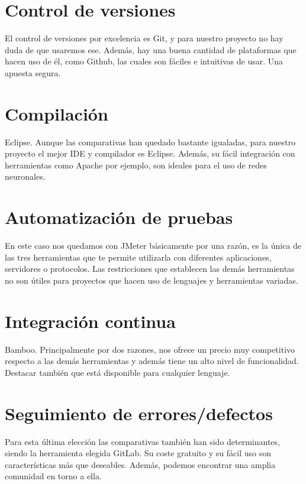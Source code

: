 	
	\newpage	
 
\section{Control de versiones}

El control de versiones por excelencia es Git, y para nuestro proyecto no hay duda de que usaremos ese. Además, hay una buena cantidad de plataformas que hacen uso de él, como Github, las cuales son fáciles e intuitivas de usar. Una apuesta segura.

\section{Compilación}

Eclipse. Aunque las comparativas han quedado bastante igualadas, para nuestro proyecto el mejor IDE y compilador es Eclipse. Además, su fácil integración con herramientas como Apache por ejemplo, son ideales para el uso de redes neuronales. 

\section{Automatización de pruebas}

En este caso nos quedamos con JMeter básicamente  por una razón, es la única de las tres herramientas que te permite utilizarla con diferentes aplicaciones, servidores o protocolos. Las restricciones que establecen las demás herramientas no son  útiles para proyectos que hacen uso de lenguajes y herramientas variadas.

\section{Integración continua}

Bamboo. Principalmente por dos razones, nos ofrece un precio muy competitivo respecto a las demás herramientas y además tiene un alto nivel de funcionalidad. Destacar también que está disponible para cualquier lenguaje.

\section{Seguimiento de errores/defectos}

Para esta última elección las comparativas también han sido determinantes, siendo la herramienta elegida GitLab. Su coste gratuito y su fácil uso son características más que deseables. Además, podemos encontrar una amplia comunidad en torno a ella.

%
%

       
